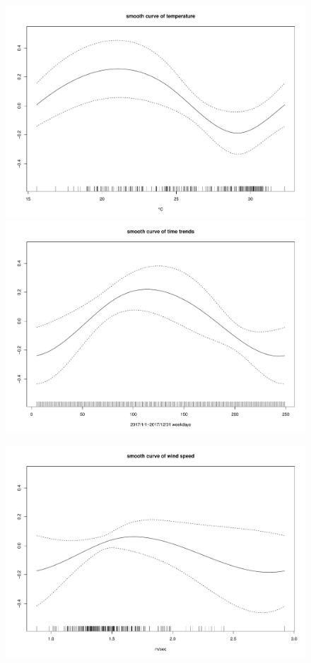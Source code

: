 \documentclass[a4paper, 12pt]{article}
\begin{document}
\begin{figure}[ht!]
       \includegraphics[width=13cm]{TEMP_SO2.pdf}
       \includegraphics[width=13cm]{TIME_SO2.pdf}
\end{figure}
\begin{figure}[ht!]
       \includegraphics[width=13cm]{WS_SO2.pdf}
\end{figure}
\end{document}
